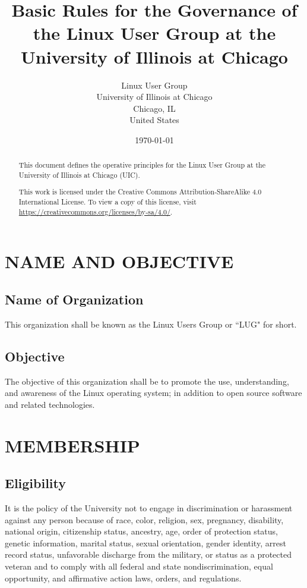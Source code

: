 \documentclass[letter]{report}
\begin{document}

\title{Basic Rules for the Governance of the Linux User Group at the University
	of Illinois at Chicago}
\author{Linux User Group\\
	University of Illinois at Chicago\\
	Chicago, IL\\
	United States}
\date{\today}
\maketitle


\begin{abstract}
	This document defines the operative principles for the Linux
	User Group at the University of Illinois at Chicago (UIC).

	\vfill
	This work is licensed under the Creative Commons Attribution-ShareAlike
	4.0 International License. To view a copy of this license, visit
	\url{https://creativecommons.org/licenses/by-sa/4.0/}.
\end{abstract}


\tableofcontents


\chapter{NAME AND OBJECTIVE}
\section{Name of Organization}
This organization shall be known as the Linux Users Group or ``LUG" for short.

\section{Objective}
The objective of this organization shall be to promote the use, understanding,
and awareness of the Linux operating system; in addition to open source software
and related technologies.


\chapter{MEMBERSHIP}
\section{Eligibility}
It is the policy of the University not to engage in discrimination or harassment
against any person because of race, color, religion, sex, pregnancy, disability,
national origin, citizenship status, ancestry, age, order of protection status,
genetic information, marital status, sexual orientation, gender identity, arrest
record status,  unfavorable discharge from the military, or status as a
protected veteran and to comply with all federal and state nondiscrimination,
equal opportunity, and affirmative action laws, orders, and regulations.
\end{document}
